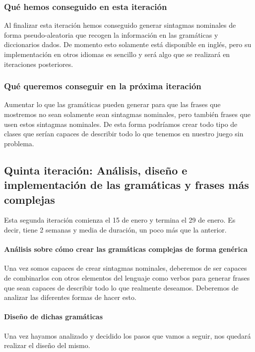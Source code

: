 \subsubsection{Qué hemos conseguido en esta iteración}

Al finalizar esta iteración hemos conseguido generar sintagmas nominales de forma pseudo-aleatoria que recogen la información en las gramáticas y diccionarios dados. De momento esto solamente está disponible en inglés, pero su implementación en otros idiomas es sencillo y será algo que se realizará en iteraciones posteriores.

\subsubsection{Qué queremos conseguir en la próxima iteración}

Aumentar lo que las gramáticas pueden generar para que las frases que mostremos no sean solamente sean sintagmas nominales, pero también frases que usen estos sintagmas nominales. De esta forma podríamos crear todo tipo de clases que serían capaces de describir todo lo que tenemos en nuestro juego sin problema.

\subsection{Quinta iteración: Análisis, diseño e implementación de las gramáticas y frases más complejas}

Esta segunda iteración comienza el 15 de enero y termina el 29 de enero. Es decir, tiene 2 semanas y media de duración, un poco más que la anterior.

\paragraph{Análisis sobre cómo crear las gramáticas complejas de forma genérica} Una vez somos capaces de crear sintagmas nominales, deberemos de ser capaces de combinarlos con otros elementos del lenguaje como verbos para generar frases que sean capaces de describir todo lo que realmente deseamos. Deberemos de analizar las diferentes formas de hacer esto.

\paragraph{Diseño de dichas gramáticas} Una vez hayamos analizado y decidido los pasos que vamos a seguir, nos quedará realizar el diseño del mismo.

